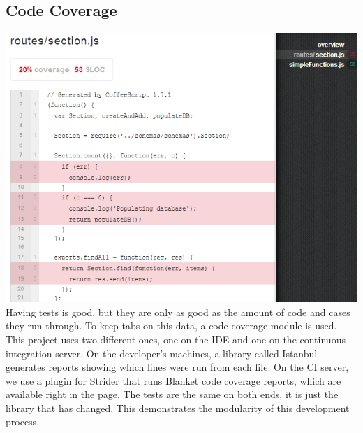 \documentclass[12pt]{article}
\begin{document}
\subsection{Code Coverage}\label{sec:coverage}
\includegraphics[width=\linewidth]{img/strider_3.png}
Having tests is good, but they are only as good as the amount of code and cases they run through. To keep tabs on this data, a code coverage module is used. This project uses two different ones, one on the IDE and one on the continuous integration server. On the developer's machines, a library called Istanbul generates reports showing which lines were run from each file. On the CI server, we use a plugin for Strider that runs Blanket code coverage reports, which are available right in the page. The tests are the same on both ends, it is just the library that has changed. This demonstrates the modularity of this development process.
\end{document}
